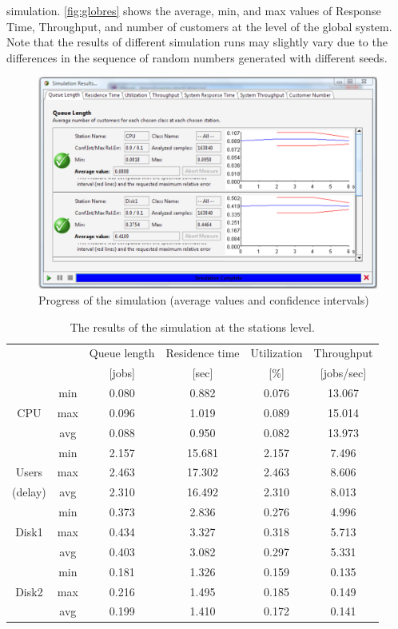 simulation. \autoref{fig:globres} shows the average, min, and
max values of Response Time, Throughput, and number of customers
at the level of the global system.\\
Note that the results of different simulation runs may slightly
vary due to the differences in the sequence of random numbers
generated with different seeds.
\begin{figure}[htb]
    \begin{center}
        \includegraphics[scale=.5]{img/jsimg/12.15.eps}
    \end{center}
    \caption{Progress of the simulation (average values and confidence
    intervals)}
    \label{fig:simres}
\end{figure}

\begin{table}
\begin{center}
  \begin{tabular}{|c|c||c|c|c|c|}
\hline
  &&Queue length&Residence time&Utilization  &Throughput \\
    &&[jobs]&[sec]&[\%]  &[jobs/sec] \\ \hline
         &min  &0.080  &0.882&0.076&13.067  \\
     CPU &max  &0.096  &1.019&0.089&15.014  \\
         &avg  &0.088  &0.950&0.082&13.973  \\ \hline
         &min  &2.157  &15.681&2.157&7.496  \\
   Users &max  &2.463  &17.302&2.463&8.606  \\
   (delay)&avg  &2.310  &16.492&2.310&8.013  \\ \hline
         &min  &0.373  &2.836&0.276&4.996  \\
    Disk1&max  &0.434  &3.327&0.318&5.713  \\
             &avg  &0.403  &3.082&0.297&5.331  \\ \hline
         &min  &0.181  &1.326&0.159&0.135  \\
    Disk2&max  &0.216  &1.495&0.185&0.149  \\
         &avg  &0.199  &1.410&0.172&0.141  \\ \hline
      \end{tabular}\\
\end{center}
 \caption{The results of the simulation at the stations level.}
 \label{fig:ressm1}
\end{table}

